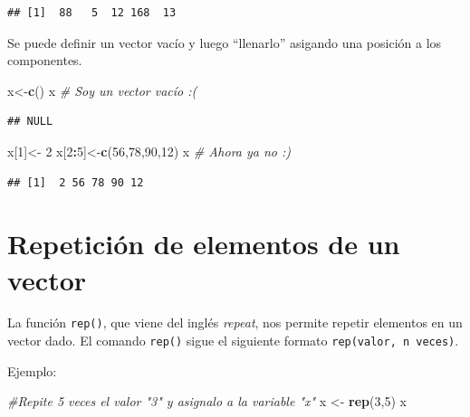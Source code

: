 \documentclass[
]{book}
\newenvironment{Shaded}{\begin{snugshade}}{\end{snugshade}}
\newcommand{\CommentTok}[1]{\textcolor[rgb]{0.56,0.35,0.01}{\textit{#1}}}
\newcommand{\DecValTok}[1]{\textcolor[rgb]{0.00,0.00,0.81}{#1}}
\newcommand{\FunctionTok}[1]{\textcolor[rgb]{0.13,0.29,0.53}{\textbf{#1}}}
\newcommand{\NormalTok}[1]{#1}
\newcommand{\OtherTok}[1]{\textcolor[rgb]{0.56,0.35,0.01}{#1}}
\newcommand{\SpecialCharTok}[1]{\textcolor[rgb]{0.81,0.36,0.00}{\textbf{#1}}}
\begin{document}
\begin{verbatim}
## [1]  88   5  12 168  13
\end{verbatim}

Se puede definir un vector vacío y luego ``llenarlo'' asigando una posición a los componentes.

\begin{Shaded}
\begin{Highlighting}[]
\NormalTok{x}\OtherTok{\textless{}{-}}\FunctionTok{c}\NormalTok{()}
\NormalTok{x                 }\CommentTok{\# Soy un vector vacío :(}
\end{Highlighting}
\end{Shaded}

\begin{verbatim}
## NULL
\end{verbatim}

\begin{Shaded}
\begin{Highlighting}[]
\NormalTok{x[}\DecValTok{1}\NormalTok{]}\OtherTok{\textless{}{-}} \DecValTok{2}
\NormalTok{x[}\DecValTok{2}\SpecialCharTok{:}\DecValTok{5}\NormalTok{]}\OtherTok{\textless{}{-}}\FunctionTok{c}\NormalTok{(}\DecValTok{56}\NormalTok{,}\DecValTok{78}\NormalTok{,}\DecValTok{90}\NormalTok{,}\DecValTok{12}\NormalTok{)}
\NormalTok{x                 }\CommentTok{\# Ahora ya no :)}
\end{Highlighting}
\end{Shaded}

\begin{verbatim}
## [1]  2 56 78 90 12
\end{verbatim}

\section{Repetición de elementos de un vector}\label{repeticiuxf3n-de-elementos-de-un-vector}

La función \texttt{rep()}, que viene del inglés \emph{repeat}, nos permite repetir elementos en un vector dado.
El comando \texttt{rep()} sigue el siguiente formato \texttt{rep(valor,\ n\ veces)}.

Ejemplo:

\begin{Shaded}
\begin{Highlighting}[]
\CommentTok{\#Repite 5 veces el valor "3" y asignalo a la variable "x"}
\NormalTok{x }\OtherTok{\textless{}{-}} \FunctionTok{rep}\NormalTok{(}\DecValTok{3}\NormalTok{,}\DecValTok{5}\NormalTok{)}
\NormalTok{x}
\end{Highlighting}
\end{Shaded}
\end{document}

